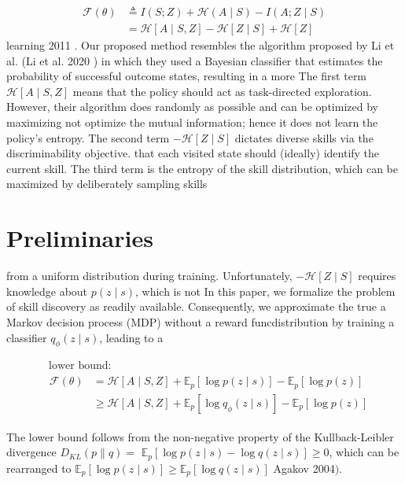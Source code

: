 $$
\begin{aligned}
\mathcal{F}(\theta) & \triangleq I(S ; Z)+\mathcal{H}(A \mid S)-I(A ; Z \mid S) \\
&=\mathcal{H}[A \mid S, Z]-\mathcal{H}[Z \mid S]+\mathcal{H}[Z]
\end{aligned}
$$
learning 2011 . Our proposed method resembles the algorithm proposed by Li et al. (Li et al. 2020 ) in which they used a Bayesian classifier that estimates the probability of successful outcome states, resulting in a more The first term $\mathcal{H}[A \mid S, Z]$ means that the policy should act as task-directed exploration. However, their algorithm does randomly as possible and can be optimized by maximizing not optimize the mutual information; hence it does not learn the policy's entropy. The second term $-\mathcal{H}[Z \mid S]$ dictates diverse skills via the discriminability objective. that each visited state should (ideally) identify the current skill. The third term is the entropy of the skill distribution, which can be maximized by deliberately sampling skills

\section{Preliminaries} from a uniform distribution during training. Unfortunately, $-\mathcal{H}[Z \mid S]$ requires knowledge about $p(z \mid s)$, which is not In this paper, we formalize the problem of skill discovery as readily available. Consequently, we approximate the true a Markov decision process (MDP) without a reward funcdistribution by training a classifier $q_{\phi}(z \mid s)$, leading to a 

$$
\begin{aligned}
&\text { lower bound: } \\
&\begin{aligned}
\mathcal{F}(\theta) &=\mathcal{H}[A \mid S, Z]+\mathbb{E}_{p}[\log p(z \mid s)]-\mathbb{E}_{p}[\log p(z)] \\
& \geq \mathcal{H}[A \mid S, Z]+\mathbb{E}_{p}\left[\log q_{\phi}(z \mid s)\right]-\mathbb{E}_{p}[\log p(z)]
\end{aligned}
\end{aligned}
$$

The lower bound follows from the non-negative property of the Kullback-Leibler divergence $D_{K L}(p \| q)=$ $\mathbb{E}_{p}[\log p(z \mid s)-\log q(z \mid s)] \geq 0$, which can be rearranged to $\mathbb{E}_{p}[\log p(z \mid s)] \geq \mathbb{E}_{p}[\log q(z \mid s)]$ Agakov 2004$)$.

